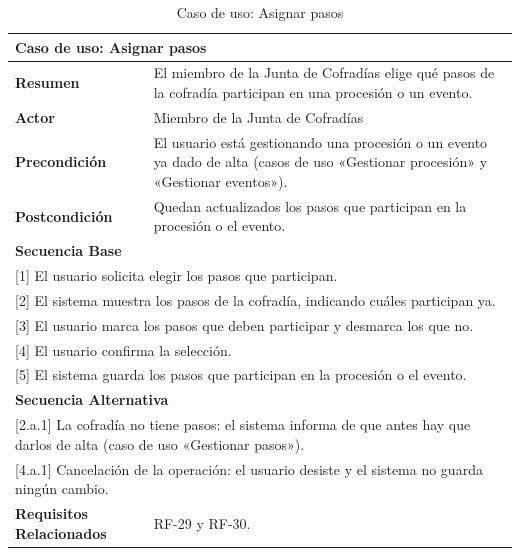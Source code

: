 \begin{table}[h!]
    \centering
    \renewcommand{\arraystretch}{1.5}

    \begin{tabular}{|p{4cm}|p{11cm}|}
        \hline
        \multicolumn{2}{|l|}{\textbf{Caso de uso: Asignar pasos}} \\
        \hline
        \textbf{Resumen} & El miembro de la Junta de Cofradías elige qué pasos de la cofradía participan en una procesión o un evento. \\
        \hline
        \textbf{Actor} & Miembro de la Junta de Cofradías \\
        \hline
        \textbf{Precondición} & El usuario está gestionando una procesión o un evento ya dado de alta (casos de uso «Gestionar procesión» y «Gestionar eventos»). \\
        \hline
        \textbf{Postcondición} & Quedan actualizados los pasos que participan en la procesión o el evento. \\
        \hline
        \multicolumn{2}{|l|}{\textbf{Secuencia Base}} \\
        \hline
        \multicolumn{2}{|p{15cm}|}{ [1] El usuario solicita elegir los pasos que participan. } \\
        \hline
        \multicolumn{2}{|p{15cm}|}{ [2] El sistema muestra los pasos de la cofradía, indicando cuáles participan ya. } \\
        \hline
        \multicolumn{2}{|p{15cm}|}{ [3] El usuario marca los pasos que deben participar y desmarca los que no. } \\
        \hline
        \multicolumn{2}{|p{15cm}|}{ [4] El usuario confirma la selección. } \\
        \hline
        \multicolumn{2}{|p{15cm}|}{ [5] El sistema guarda los pasos que participan en la procesión o el evento. } \\
        \hline
        \multicolumn{2}{|l|}{\textbf{Secuencia Alternativa}} \\
        \hline
        \multicolumn{2}{|p{15cm}|}{ [2.a.1] La cofradía no tiene pasos: el sistema informa de que antes hay que darlos de alta (caso de uso «Gestionar pasos»). } \\
        \hline
        \multicolumn{2}{|p{15cm}|}{ [4.a.1] Cancelación de la operación: el usuario desiste y el sistema no guarda ningún cambio. } \\
        \hline
        \textbf{Requisitos Relacionados} & RF-29 y RF-30. \\
        \hline
    \end{tabular}
    \caption{Caso de uso: Asignar pasos}
\end{table}

